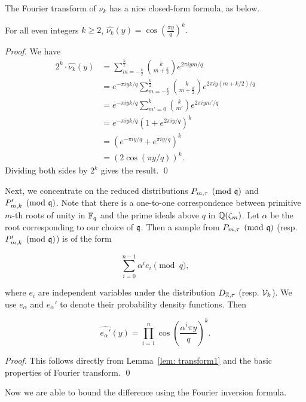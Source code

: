 \documentclass[envcountsect]{llncs}
\begin{document}
The Fourier transform of $\nu_k$ has a nice closed-form formula, as below.
\begin{lemma}
\label{lem: transform1}
For all even integers $k \geq 2$, $\widehat{\nu_k}(y)  = \cos \left(\frac{\pi y}{q}\right)^k.$
\end{lemma}

\begin{proof}  We have
\begin{align*}
2^k \cdot \widehat{\nu_k}(y) &= \sum_{m = -\frac{k}{2}}^{\frac{k}{2}} {k \choose m+\frac{k}{2}} e^{2\pi i ym/q}  \\
&= e^{-\pi i yk/q}\sum_{m = -\frac{k}{2}}^{\frac{k}{2}} {k \choose m+\frac{k}{2}} e^{2\pi i y(m+k/2)/q} \\
&= e^{-\pi i yk/q} \sum_{m' = 0}^{k} {k \choose m'} e^{2\pi i ym'/q} \\
& =  e^{-\pi i yk/q} (1+ e^{2 \pi i y/q})^k \\
& = (e^{-\pi i y/q} + e^{\pi i y/q})^k  \\
& = (2 \cos(\pi y/q))^k.
\end{align*}
Dividing both sides by $2^k$ gives the result.
\qed \end{proof}


Next, we concentrate on the reduced distributions $P_{m,\tau} \pmod{\mathfrak{q}}$ and $P'_{m,k} \pmod {\mathfrak{q}}$. Note that there is a one-to-one correspondence between primitive $m$-th roots of unity in $\mathbb{F}_q$ and the prime ideals above $q$ in $\mathbb{Q}(\zeta_m)$. Let $\alpha$ be the root corresponding to our choice of $\mathfrak{q}$. Then a sample from $P_{m, \tau} \pmod{\mathfrak{q}}$ (resp. $P'_{m,k} \pmod {\mathfrak{q}}$) is
of the form

$$ \sum_{i=0}^{n-1} \alpha^i e_i \pmod {q},$$

where $e_i$ are independent variables under the distribution $D_{\mathbb{Z},\tau}$ (resp. $\mathcal{V}_k$). We use $e_\alpha$ and $e_\alpha'$ to denote their probability density functions. Then

\begin{lemma}
\label{lem: transform2}
\[
    \widehat{e_\alpha'}(y) = \prod_{i=1}^{n} \cos \left(\frac{ \alpha^i \pi y}{q} \right)^k.
\]
\end{lemma}

\begin{proof}
This follows directly from Lemma~\ref{lem: transform1} and the basic properties of Fourier transform.
\qed \end{proof}

Now we are able to bound the difference  using the Fourier inversion formula.
\end{document}
